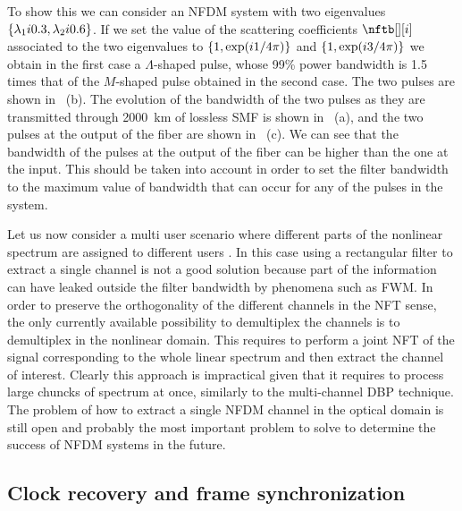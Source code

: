 To show this we can consider an \ac{NFDM} system with two eigenvalues $\{\eig[1]\iunit0.3, \eig[2]\iunit0.6\}$. If we set the value of the scattering coefficients $\nftb[][i]$ associated to the two eigenvalues to $\{1, \exp (\iunit 1/4\pi)\}$ and $\{1, \exp (\iunit 3/4\pi)\}$ we obtain in the first case a $\Lambda$-shaped pulse, whose 99\% power bandwidth is 1.5 times that of the $M$-shaped pulse obtained in the second case. The two pulses are shown in  ~(b). The evolution of the bandwidth of the two pulses as they are transmitted through \SI{2000}{\km} of lossless \ac{SMF} is shown in ~(a), and the two pulses at the output of the fiber are shown in ~(c). We can see that the bandwidth of the pulses at the output of the fiber can be higher than the one at the input. This should be taken into account in order to set the filter bandwidth to the maximum value of bandwidth that can occur for any of the pulses in the system.

Let us now consider a multi user scenario  where different parts of the nonlinear spectrum are assigned to different users \cite{yousefi2016linear}. In this case using a rectangular filter to extract a
single channel is not a good solution because part of the information can have leaked outside the filter bandwidth by phenomena such as \ac{FWM}. In order to preserve the orthogonality of the different channels in the \ac{NFT} sense, the only currently available possibility to demultiplex the channels is to demultiplex in the nonlinear domain. This requires to perform a joint \ac{NFT} of the signal corresponding to the whole linear spectrum and then extract the channel of interest. Clearly this approach is impractical given that it requires to process large chuncks of spectrum at once, similarly to the multi-channel \ac{DBP} technique.
The problem of how to extract a single \ac{NFDM} channel in the optical domain is
still open and probably the most important problem to solve to determine the
success of \ac{NFDM} systems in the future.


\subsection{Clock recovery and frame synchronization}\label{sec:nfdm_clock_recovery}

